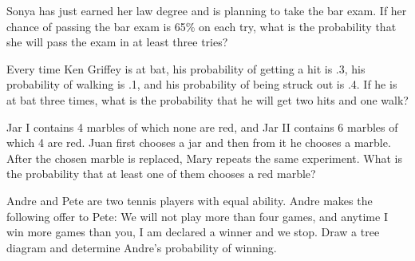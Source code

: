 \begin{puzzle}
    Sonya has just earned her law degree and is planning to take the bar exam. If her chance of passing the bar exam is 65\% on each try, what is the probability that she will pass the exam in at least three tries?
\end{puzzle}

\begin{puzzle}
    Every time Ken Griffey is at bat, his probability of getting a hit is .3, his probability of walking is .1, and his probability of being struck out is .4. If he is at bat three times, what is the probability that he will get two hits and one walk?
\end{puzzle}

\begin{puzzle}
    Jar I contains 4 marbles of which none are red, and Jar II contains 6 marbles of which 4 are red. Juan first chooses a jar and then from it he chooses a marble. After the chosen marble is replaced, Mary repeats the same experiment. What is the probability that at least one of them chooses a red marble?
\end{puzzle}

\begin{puzzle}
    Andre and Pete are two tennis players with equal ability. Andre makes the following offer to Pete: We will not play more than four games, and anytime I win more games than you, I am declared a winner and we stop. Draw a tree diagram and determine Andre’s probability of winning.
\end{puzzle}
